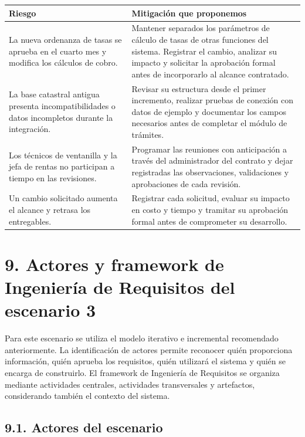 \documentclass[10pt,letterpaper]{article}
\newcommand{\titulo}[1]{\section*{\textcolor{verde}{#1}}}
\newcommand{\subtitulo}[1]{\subsection*{\textcolor{azul}{#1}}}
\begin{document}
\begin{tabularx}{\linewidth}{@{}p{6cm}Y@{}}
\color{white}\textbf{Riesgo}&\color{white}\textbf{Mitigación que proponemos}\\\midrule
La nueva ordenanza de tasas se aprueba en el cuarto mes y modifica los cálculos de cobro.&Mantener separados los parámetros de cálculo de tasas de otras funciones del sistema. Registrar el cambio, analizar su impacto y solicitar la aprobación formal antes de incorporarlo al alcance contratado.\\
La base catastral antigua presenta incompatibilidades o datos incompletos durante la integración.&Revisar su estructura desde el primer incremento, realizar pruebas de conexión con datos de ejemplo y documentar los campos necesarios antes de completar el módulo de trámites.\\
Los técnicos de ventanilla y la jefa de rentas no participan a tiempo en las revisiones.&Programar las reuniones con anticipación a través del administrador del contrato y dejar registradas las observaciones, validaciones y aprobaciones de cada revisión.\\
Un cambio solicitado aumenta el alcance y retrasa los entregables.&Registrar cada solicitud, evaluar su impacto en costo y tiempo y tramitar su aprobación formal antes de comprometer su desarrollo.\\
\end{tabularx}
\par
\titulo{9. Actores y framework de Ingeniería de Requisitos del escenario 3}
\par
Para este escenario se utiliza el modelo iterativo e incremental recomendado anteriormente. La identificación de actores permite reconocer quién proporciona información, quién aprueba los requisitos, quién utilizará el sistema y quién se encarga de construirlo. El framework de Ingeniería de Requisitos se organiza mediante actividades centrales, actividades transversales y artefactos, considerando también el contexto del sistema.
\par
\subtitulo{9.1. Actores del escenario}
\par
\small
\par
\end{document}
